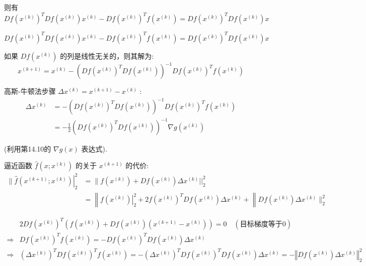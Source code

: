 则有
\begin{equation} D f\left(x^{(k)}\right)^{T} D f\left(x^{(k)}\right) x^{(k)}-D f\left(x^{(k)}\right)^{T} f\left(x^{(k)}\right)=D f\left(x^{(k)}\right)^{T} D f\left(x^{(k)}\right) x \end{equation}

\begin{equation} D f\left(x^{(k)}\right)^{T} D f\left(x^{(k)}\right) x^{(k)}-D f\left(x^{(k)}\right)^{T} f\left(x^{(k)}\right)=D f\left(x^{(k)}\right)^{T} D f\left(x^{(k)}\right) x \end{equation}

如果 $ D f\left(x^{(k)}\right) $ 的列是线性无关的，则其解为:
\begin{equation}
x^{(k+1)}=x^{(k)}-\left(D f\left(x^{(k)}\right)^{T} D f\left(x^{(k)}\right)\right)^{-1} D f\left(x^{(k)}\right)^{T} f\left(x^{(k)}\right)
\end{equation}

高斯-牛顿法步骤 $ \Delta x^{(k)}=x^{(k+1)}-x^{(k)} $ :
\begin{equation}
\begin{aligned}
\Delta x^{(k)} &=-\left(D f\left(x^{(k)}\right)^{T} D f\left(x^{(k)}\right)\right)^{-1} D f\left(x^{(k)}\right)^{T} f\left(x^{(k)}\right) \\
&=-\frac{1}{2}\left(D f\left(x^{(k)}\right)^{T} D f\left(x^{(k)}\right)\right)^{-1} \nabla g\left(x^{(k)}\right)
\end{aligned}
\end{equation}

(利用第14.10的 $ \nabla g(x) $ 表达式).

逼近函数 $ \hat{f}\left(x ; x^{(k)}\right) $ 的关于 $ x^{(k+1)} $ 的代价:
\begin{equation}
\begin{aligned}
\|\left.\hat{f}\left(x^{(k+1)} ; x^{(k)}\right)\right|_{2} ^{2} &=\| f\left(x^{(k)}\right)+D f\left(x^{(k)}\right) \Delta x^{(k)}||_{2}^{2} \\
&=\left\|\left.f\left(x^{(k)}\right)\right|_{2} ^{2}+2 f\left(x^{(k)}\right)^{T} D f\left(x^{(k)}\right) \Delta x^{(k)}+\right\| D f\left(x^{(k)}\right) \Delta x^{(k)} \|_{2}^{2}
\end{aligned}
\end{equation}

\begin{equation}\begin{aligned}
    & 2Df\left( x^{(k)}\right)^{T}\left( f\left( x^{(k)}\right) +Df\left( x^{(k)}\right)\left( x^{(k+1)} -x^{(k)}\right)\right) =0\quad ( 目标梯度等于0)\\
   \Rightarrow  & Df\left( x^{(k)}\right)^{T} f\left( x^{(k)}\right) =-Df\left( x^{(k)}\right)^{T} Df\left( x^{(k)}\right) \Delta x^{(k)}\\
   \Rightarrow  & \left( \Delta x^{(k)}\right)^{T} Df\left( x^{(k)}\right)^{T} f\left( x^{(k)}\right) =-\left( \Delta x^{(k)}\right)^{T} Df\left( x^{(k)}\right)^{T} Df\left( x^{(k)}\right) \Delta x^{(k)} =-\left\Vert Df\left( x^{(k)}\right) \Delta x^{(k)}\right\Vert _{2}^{2}
   \end{aligned}\end{equation}

